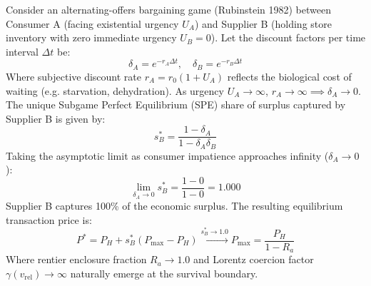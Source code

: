 \documentclass[preprint,12pt,authoryear]{elsarticle}
\theoremstyle{definition}
\begin{document}
Consider an alternating-offers bargaining game (Rubinstein 1982) between Consumer A (facing existential urgency $U_A$) and Supplier B (holding store inventory with zero immediate urgency $U_B = 0$).  
Let the discount factors per time interval $\Delta t$ be:  
$$\delta_A = e^{-r_A \Delta t}, \quad \delta_B = e^{-r_B \Delta t}$$  
Where subjective discount rate $r_A = r_0 (1 + U_A)$ reflects the biological cost of waiting (e.g. starvation, dehydration). As urgency $U_A \to \infty$, $r_A \to \infty \implies \delta_A \to 0$.  
The unique Subgame Perfect Equilibrium (SPE) share of surplus captured by Supplier B is given by:  
$$s_B^* = \frac{1 - \delta_A}{1 - \delta_A \delta_B}$$  
Taking the asymptotic limit as consumer impatience approaches infinity ($\delta_A \to 0$):  
$$\lim_{\delta_A \to 0} s_B^* = \frac{1 - 0}{1 - 0} = 1.000$$  
Supplier B captures 100\% of the economic surplus. The resulting equilibrium transaction price is:  
$$P^* = P_H + s_B^* (P_{\text{max}} - P_H) \xrightarrow{s_B^* \to 1.0} P_{\text{max}} = \frac{P_H}{1 - R_a}$$  
Where rentier enclosure fraction $R_a \to 1.0$ and Lorentz coercion factor $\gamma(v_{\text{rel}}) \to \infty$ naturally emerge at the survival boundary.




\end{document}
